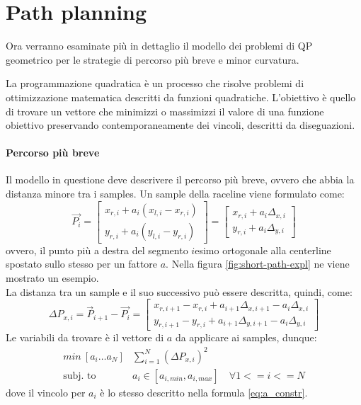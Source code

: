 \section{Path planning}
\label{sec:path-models}
Ora verranno esaminate più in dettaglio il modello dei problemi di QP
geometrico per le strategie di percorso più breve e minor curvatura.

La programmazione quadratica è un processo che risolve problemi di ottimizzazione matematica descritti da
funzioni quadratiche. L'obiettivo è quello di trovare un vettore che minimizzi o massimizzi il valore di
una funzione obiettivo preservando contemporaneamente dei vincoli, descritti da diseguazioni.

\paragraph{Percorso più breve}\cite{race-model}\cite{globalplanning-lec}
Il modello in questione deve descrivere il percorso più breve, ovvero che abbia la distanza minore tra i
samples. Un sample della raceline viene formulato come:
\[
	\overrightarrow{P_i} =
	\begin{bmatrix}
		x_{r,i} + a_i(x_{l,i} - x_{r,i}) \\
		y_{r,i} + a_i(y_{l,i} - y_{r,i})
	\end{bmatrix} =
	\begin{bmatrix}
		x_{r,i} + a_i\Delta_{x,i} \\
		y_{r,i} + a_i\Delta_{y,i}
	\end{bmatrix}
\]
ovvero, il punto più a destra del segmento $i$esimo ortogonale alla centerline spostato sullo stesso per
un fattore $a$. Nella figura \ref{fig:short-path-expl} ne viene mostrato un esempio.\\
La distanza tra un sample e il suo successivo può essere descritta, quindi, come:
\[
	\Delta P_{x, i} = \overrightarrow{P}_{i+1} - \overrightarrow{P_i} = \begin{bmatrix}
		x_{r,i+1} - x_{r,i} + a_{i+1}\Delta_{x,i+1} - a_i\Delta_{x, i} \\
		y_{r,i+1} - y_{r,i} + a_{i+1}\Delta_{y,i+1} - a_i\Delta_{y, i}
	\end{bmatrix}
\]
Le variabili da trovare è il vettore di $a$ da applicare ai samples, dunque:
\[
	\begin{aligned}
		min\ [a_i \dots a_N] & \sum_{i=1}^{N} (\Delta P_{x,i})^2                          \\
		\text{subj. to}\     & a_i \in [a_{i, min}, a_{i, max}] \quad \forall 1 <= i <= N
	\end{aligned}
\]
dove il vincolo per $a_i$ è lo stesso descritto nella formula \ref{eq:a_constr}.

